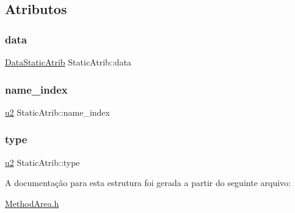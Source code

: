 \subsection{Atributos}
\mbox{\label{structStaticAtrib_aa9c612ef7f4696833d6658c21691b048}} 
\subsubsection{\texorpdfstring{data}{data}}
{\footnotesize\ttfamily \hyperlink{unionDataStaticAtrib}{Data\+Static\+Atrib} Static\+Atrib\+::data}

\mbox{\label{structStaticAtrib_a7066a25332e32a5d8eccc92d8b303635}} 
\subsubsection{\texorpdfstring{name\+\_\+index}{name\_index}}
{\footnotesize\ttfamily \hyperlink{ClassLoader_8h_a5f223212eef04d10a4550ded680cb1cf}{u2} Static\+Atrib\+::name\+\_\+index}

\mbox{\label{structStaticAtrib_ace3f941daa9df10a76029562b3f9cef3}} 
\subsubsection{\texorpdfstring{type}{type}}
{\footnotesize\ttfamily \hyperlink{ClassLoader_8h_a5f223212eef04d10a4550ded680cb1cf}{u2} Static\+Atrib\+::type}



A documentação para esta estrutura foi gerada a partir do seguinte arquivo\+:\begin{DoxyCompactItemize}
\item 
\hyperlink{MethodArea_8h}{Method\+Area.\+h}\end{DoxyCompactItemize}
